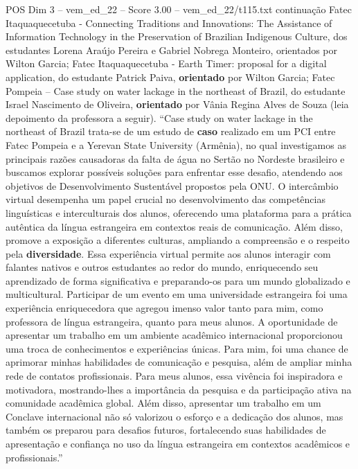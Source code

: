 \begin{textsample}{POS Dim 3 – vem\_ed\_22 – Score 3.00 – vem\_ed\_22/t115.txt}  \label{ex:f3_pos_165}
continuação Fatec Itaquaquecetuba - Connecting Traditions and Innovations: The Assistance of Information Technology in the Preservation of Brazilian Indigenous Culture, dos estudantes Lorena Araújo Pereira e Gabriel Nobrega Monteiro, orientados por Wilton Garcia; Fatec Itaquaquecetuba - Earth Timer: proposal for a digital application, do estudante Patrick Paiva, \textbf{orientado} por Wilton Garcia; Fatec Pompeia – Case study on water lackage in the northeast of Brazil, do estudante Israel Nascimento de Oliveira, \textbf{orientado} por Vânia Regina Alves de Souza (leia depoimento da professora a seguir). “Case study on water lackage in the northeast of Brazil trata-se de um estudo de \textbf{caso} realizado em um PCI entre Fatec Pompeia e a Yerevan State University (Armênia), no qual investigamos as principais razões causadoras da falta de água no Sertão no Nordeste brasileiro e buscamos explorar possíveis soluções para enfrentar esse desafio, atendendo aos objetivos de Desenvolvimento Sustentável propostos pela ONU.
O intercâmbio virtual desempenha um papel crucial no desenvolvimento das competências linguísticas e interculturais dos alunos, oferecendo uma plataforma para a prática autêntica da língua estrangeira em contextos reais de comunicação.
Além disso, promove a exposição a diferentes culturas, ampliando a compreensão e o respeito pela \textbf{diversidade}.
Essa experiência virtual permite aos alunos interagir com falantes nativos e outros estudantes ao redor do mundo, enriquecendo seu aprendizado de forma significativa e preparando-os para um mundo globalizado e multicultural.
Participar de um evento em uma universidade estrangeira foi uma experiência enriquecedora que agregou imenso valor tanto para mim, como professora de língua estrangeira, quanto para meus alunos.
A oportunidade de apresentar um trabalho em um ambiente acadêmico internacional proporcionou uma troca de conhecimentos e experiências únicas.
Para mim, foi uma chance de aprimorar minhas habilidades de comunicação e pesquisa, além de ampliar minha rede de contatos profissionais.
Para meus alunos, essa vivência foi inspiradora e motivadora, mostrando-lhes a importância da pesquisa e da participação ativa na comunidade acadêmica global.
Além disso, apresentar um trabalho em um Conclave internacional não só valorizou o esforço e a dedicação dos alunos, mas também os preparou para desafios futuros, fortalecendo suas habilidades de apresentação e confiança no uso da língua estrangeira em contextos acadêmicos e profissionais.”

\end{textsample}
